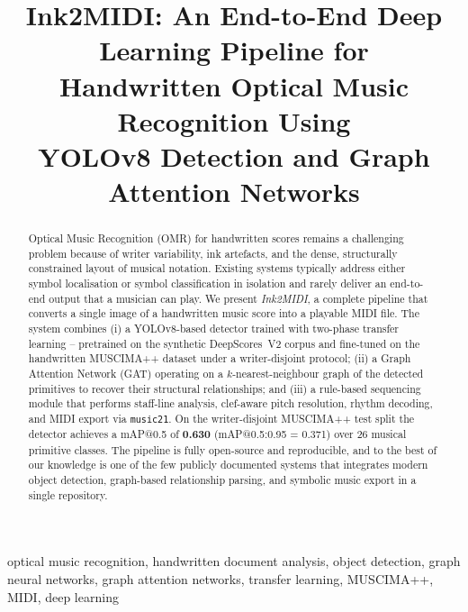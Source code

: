 \documentclass[conference]{IEEEtran}
\begin{document}
\title{Ink2MIDI: An End-to-End Deep Learning Pipeline for\\Handwritten Optical Music Recognition Using\\YOLOv8 Detection and Graph Attention Networks}

\author{
}

\maketitle

\begin{abstract}
Optical Music Recognition (OMR) for handwritten scores remains a challenging
problem because of writer variability, ink artefacts, and the dense, structurally
constrained layout of musical notation. Existing systems typically address
either symbol localisation or symbol classification in isolation and rarely
deliver an end-to-end output that a musician can play. We present
\textit{Ink2MIDI}, a complete pipeline that converts a single image of a
handwritten music score into a playable MIDI file. The system combines (i) a
YOLOv8-based detector trained with two-phase transfer learning -- pretrained on
the synthetic DeepScores~V2 corpus and fine-tuned on the handwritten
MUSCIMA++ dataset under a writer-disjoint protocol; (ii) a Graph Attention
Network (GAT) operating on a $k$-nearest-neighbour graph of the detected
primitives to recover their structural relationships; and (iii) a rule-based
sequencing module that performs staff-line analysis, clef-aware pitch
resolution, rhythm decoding, and MIDI export via \texttt{music21}. On the
writer-disjoint MUSCIMA++ test split the detector achieves a mAP@0.5 of
\textbf{0.630} (mAP@0.5:0.95 = 0.371) over 26 musical primitive classes.
The pipeline is fully open-source and reproducible, and to the best of our
knowledge is one of the few publicly documented systems that integrates
modern object detection, graph-based relationship parsing, and symbolic
music export in a single repository.
\end{abstract}

\begin{IEEEkeywords}
optical music recognition, handwritten document analysis, object detection,
graph neural networks, graph attention networks, transfer learning,
MUSCIMA++, MIDI, deep learning
\end{IEEEkeywords}
\end{document}
